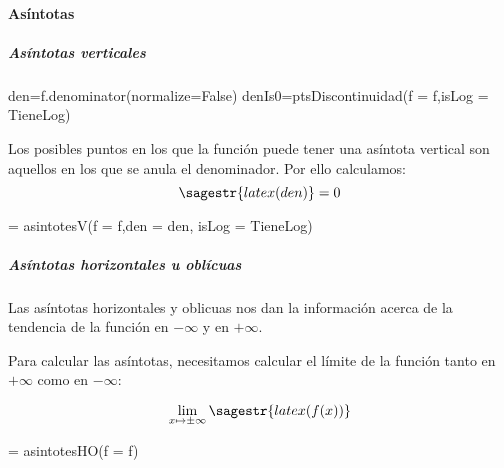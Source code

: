 \paragraph{Asíntotas}
\subparagraph{Asíntotas verticales}

\begin{sagesilent}
den=f.denominator(normalize=False)
denIs0=ptsDiscontinuidad(f = f,isLog = TieneLog)
\end{sagesilent}


\ifverbose
Los posibles puntos en los que la función puede tener una asíntota vertical son aquellos en los que se anula el denominador. 
%
Por ello calculamos:
%
\[\sagestr{latex(den)} = 0 \]
\fi
\begin{sagesilent}
[strAV,AV] = asintotesV(f = f,den = den, isLog = TieneLog)
\end{sagesilent}


\subparagraph{Asíntotas horizontales u oblícuas}

\ifverbose
Las asíntotas horizontales y oblicuas nos dan la información acerca de la tendencia de la función en $-\infty$ y en $+\infty$.

Para calcular las asíntotas, necesitamos calcular el límite de la función tanto en $+\infty$ como en $-\infty$:
\fi

\[\lim_{x\mapsto \pm\infty} \sagestr{latex(f(x))} \]

\begin{sagesilent}
[strAHO,AH,AO] = asintotesHO(f = f)
\end{sagesilent}

